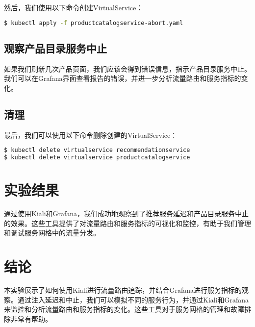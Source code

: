 然后，我们使用以下命令创建VirtualService：

\begin{lstlisting}[language=bash]
$ kubectl apply -f productcatalogservice-abort.yaml
\end{lstlisting}

\subsection{观察产品目录服务中止}

如果我们刷新几次产品页面，我们应该会得到错误信息，指示产品目录服务中止。我们可以在Grafana界面查看报告的错误，并进一步分析流量路由和服务指标的变化。

\subsection{清理}

最后，我们可以使用以下命令删除创建的VirtualService：

\begin{lstlisting}[language=bash]
$ kubectl delete virtualservice recommendationservice
$ kubectl delete virtualservice productcatalogservice
\end{lstlisting}

\section{实验结果}

通过使用Kiali和Grafana，我们成功地观察到了推荐服务延迟和产品目录服务中止的效果。这些工具提供了对流量路由和服务指标的可视化和监控，有助于我们管理和调试服务网格中的流量分发。

\section{结论}

本实验展示了如何使用Kiali进行流量路由追踪，并结合Grafana进行服务指标的观察。通过注入延迟和中止，我们可以模拟不同的服务行为，并通过Kiali和Grafana来监控和分析流量路由和服务指标的变化。这些工具对于服务网格的管理和故障排除非常有帮助。

